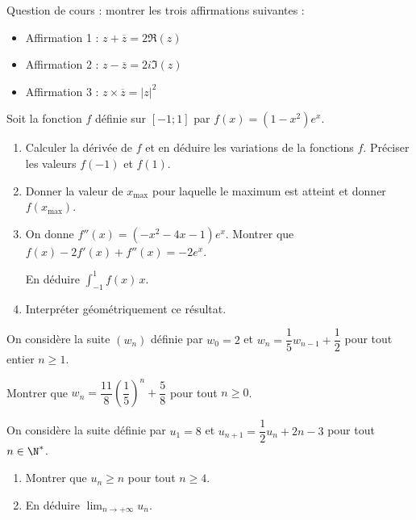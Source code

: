 \begin{question}[topic=nombres_complexes]
  Question de cours : montrer les trois affirmations suivantes :
  \begin{itemize}
    \item Affirmation 1 : $z + \overline{z} = 2\Re(z)$
    \item Affirmation 2 : $z - \overline{z} = 2i\Im(z)$
    \item Affirmation 3 : $z \times \overline{z} = \lvert z \rvert^2$
  \end{itemize}
\end{question}

\begin{question}[topic=fonction]
  Soit la fonction $f$ définie sur $[-1;1]$ par $f(x) = (1-x^2)e^x$.

  \begin{enumerate}
    \item Calculer la dérivée de $f$ et en déduire les variations de la
      fonctions $f$. Préciser les valeurs $f(-1)$ et $f(1)$.
    \item Donner la valeur de $x_{\max}$ pour laquelle le maximum est
      atteint et donner $f(x_{\max})$.
    \item On donne $f''(x) = \left(-x^2-4x-1\right)e^{x}$. Montrer que
      $f(x) - 2f'(x) + f''(x) = - 2e^x$.

      En déduire $\int_{-1}^1 f(x) \mathrm\,x$.
    \item Interpréter géométriquement ce résultat.
  \end{enumerate}
\end{question}

\begin{question}[topic=suite]
  On considère la suite $(w_n)$ définie par $w_0=2$ et
  $w_n=\dfrac15w_{n-1}+\dfrac12$ pour tout entier $n\geqslant1$.

  Montrer que $w_n=\dfrac{11}{8}\left(\dfrac{1}{5}\right)^n+\dfrac{5}{8}$
  pour tout $n\geqslant0$.
\end{question}

\begin{question}[topic=suite]
  On considère la suite définie par $u_1=8$ et
  ${u_{n+1}=\dfrac{1}{2}u_n+2n-3}$ pour tout $n\in\N^*$.
  \begin{enumerate}
    \item Montrer que $u_n\geqslant n$ pour tout $n\geqslant 4$.
    \item En déduire $\displaystyle \lim_{n\rightarrow +\infty} u_n$.
  \end{enumerate}
\end{question}


